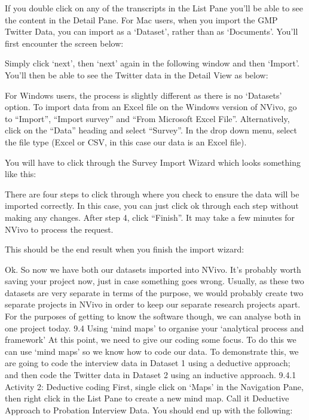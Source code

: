 \documentclass[
]{book}
\begin{document}
If you double click on any of the transcripts in the List Pane you'll be able to see the content in the Detail Pane.
For Mac users, when you import the GMP Twitter Data, you can import as a `Dataset', rather than as `Documents'. You'll first encounter the screen below:

Simply click `next', then `next' again in the following window and then `Import'. You'll then be able to see the Twitter data in the Detail View as below:

For Windows users, the process is slightly different as there is no `Datasets' option. To import data from an Excel file on the Windows version of NVivo, go to ``Import'', ``Import survey'' and ``From Microsoft Excel File''. Alternatively, click on the ``Data'' heading and select ``Survey''. In the drop down menu, select the file type (Excel or CSV, in this case our data is an Excel file).

You will have to click through the Survey Import Wizard which looks something like this:

There are four steps to click through where you check to ensure the data will be imported correctly. In this case, you can just click ok through each step without making any changes. After step 4, click ``Finish''. It may take a few minutes for NVivo to process the request.

This should be the end result when you finish the import wizard:

Ok. So now we have both our datasets imported into NVivo. It's probably worth saving your project now, just in case something goes wrong.
Usually, as these two datasets are very separate in terms of the purpose, we would probably create two separate projects in NVivo in order to keep our separate research projects apart. For the purposes of getting to know the software though, we can analyse both in one project today.
9.4 Using `mind maps' to organise your `analytical process and framework'
At this point, we need to give our coding some focus. To do this we can use `mind maps' so we know how to code our data. To demonstrate this, we are going to code the interview data in Dataset 1 using a deductive approach; and then code the Twitter data in Dataset 2 using an inductive approach.
9.4.1 Activity 2: Deductive coding
First, single click on `Maps' in the Navigation Pane, then right click in the List Pane to create a new mind map. Call it Deductive Approach to Probation Interview Data. You should end up with the following:
\end{document}
